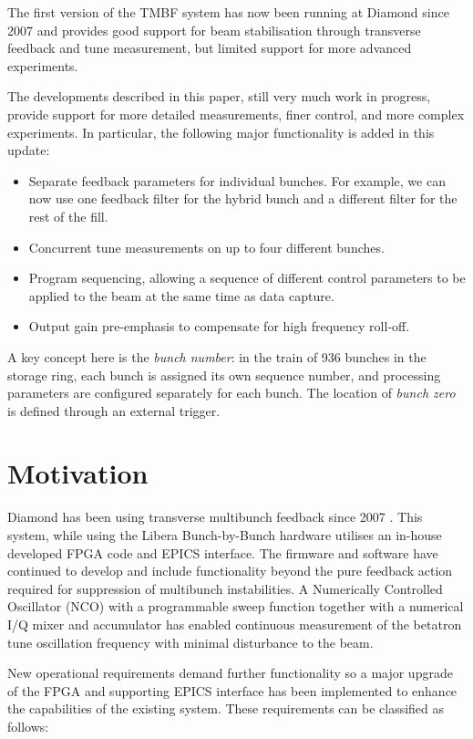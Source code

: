 \documentclass{JAC2003}
\begin{document}
The first version of the TMBF system has now been running at Diamond since 2007
and provides good support for beam stabilisation through transverse feedback and
tune measurement, but limited support for more advanced experiments.

The developments described in this paper, still very much work in progress,
provide support for more detailed measurements, finer control, and more complex
experiments.  In particular, the following major functionality is added in this
update:

\begin{itemize}
\item
    Separate feedback parameters for individual bunches.  For example, we can
now use one feedback filter for the hybrid bunch and a different filter for the
rest of the fill.
\item
    Concurrent tune measurements on up to four different bunches.
\item
    Program sequencing, allowing a sequence of different control parameters to
be applied to the beam at the same time as data capture.
\item
    Output gain pre-emphasis to compensate for high frequency roll-off.
\end{itemize}

A key concept here is the \emph{bunch number}: in the train of 936 bunches in
the storage ring, each bunch is assigned its own sequence number, and processing
parameters are configured separately for each bunch.  The location of
\emph{bunch zero} is defined through an external trigger.


\section{Motivation}

Diamond has been using transverse multibunch feedback since 2007
\cite{early-tmbf, performance}.  This system, while using the Libera
Bunch-by-Bunch hardware utilises an in-house developed FPGA code and EPICS
interface.  The firmware and software have continued to develop and include
functionality beyond the pure feedback action required for suppression of
multibunch instabilities.  A Numerically Controlled Oscillator (NCO) with a
programmable sweep function together with a numerical I/Q mixer and accumulator
has enabled continuous measurement of the betatron tune oscillation frequency
\cite{status} with minimal disturbance to the beam.

New operational requirements demand further functionality so a major upgrade of
the FPGA and supporting EPICS interface has been implemented to enhance the
capabilities of the existing system.  These requirements can be classified as
follows:
\end{document}
